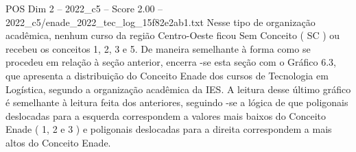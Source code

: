 \begin{textsample}{POS Dim 2 – 2022\_c5 – Score 2.00 – 2022\_c5/enade\_2022\_tec\_log\_15f82e2ab1.txt}
Nesse tipo de organização acadêmica, nenhum curso da região Centro-Oeste ficou Sem Conceito ( SC ) ou recebeu os conceitos 1, 2, 3 e 5.
De maneira semelhante à forma como se procedeu em relação à seção anterior, encerra -se esta seção com o Gráfico 6.3, que apresenta a distribuição do Conceito Enade dos cursos de Tecnologia em Logística, segundo a organização acadêmica da IES.
A leitura desse último gráfico é semelhante à leitura feita dos anteriores, seguindo -se a lógica de que poligonais deslocadas para a esquerda correspondem a valores mais baixos do Conceito Enade ( 1, 2 e 3 ) e poligonais deslocadas para a direita correspondem a mais altos do Conceito Enade.

\end{textsample}

